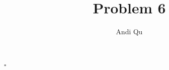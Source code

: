 \documentclass[11pt]{scrartcl}
\title{Problem 6}
\author{Andi Qu}
\newcommand*{\QED}{\hfill\ensuremath{\square}}%
\begin{document}
\maketitle



\QED
\end{document}
